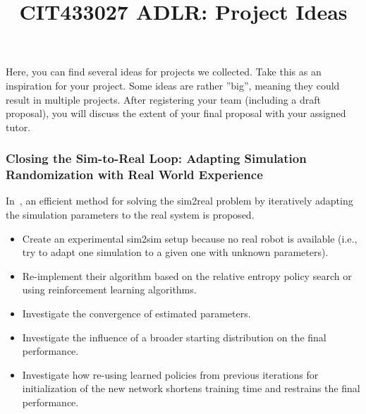 \documentclass[a4paper]{article}
\title{CIT433027 ADLR: Project Ideas}
\author{}
\begin{document}
\maketitle

Here, you can find several ideas for projects we collected.
Take this as an inspiration for your project.
Some ideas are rather ”big”, meaning they could result in multiple projects.
After registering your team (including a draft proposal), you will discuss the extent of your final proposal with your assigned tutor.

\subsubsection{Closing the Sim-to-Real Loop: Adapting Simulation Randomization with Real World Experience}
In~\citet{Chebotar2018}, an efficient method for solving the sim2real problem by iteratively adapting the simulation parameters to the real system is proposed.
\begin{itemize}
  \item Create an experimental sim2sim setup because no real robot is available (i.e., try to adapt one simulation to a given one with unknown parameters).
  \item Re-implement their algorithm based on the relative entropy policy search or using reinforcement learning algorithms.
  \item Investigate the convergence of estimated parameters.
  \item Investigate the influence of a broader starting distribution on the final performance.
  \item Investigate how re-using learned policies from previous iterations for initialization of the new network shortens training time and restrains the final performance.
\end{itemize}

\end{document}
